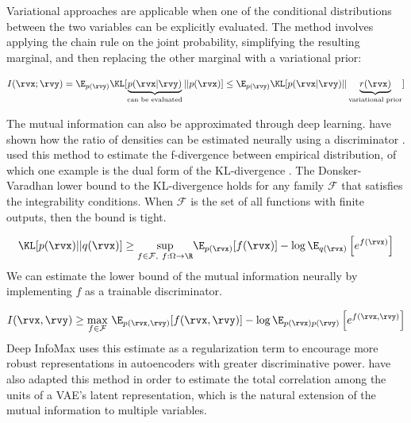 \documentclass[withindex,glossary,firstyr,times]{cam-thesis}
\begin{document}
Variational approaches \citet{houthooft2016vime, alemi2016deep} are applicable when one of the conditional distributions between the two variables can be explicitly evaluated. The method involves applying the chain rule on the joint probability, simplifying the resulting marginal, and then replacing the other marginal with a variational prior:

\begin{equation}
    I(\rvx; \rvy) = \E_{p(\rvy)} \KL[\underbrace{p(\rvx | \rvy)}_{\text{can be evaluated}} || p(\rvx)] \leq \E_{p(\rvy)} \KL[p(\rvx | \rvy) || \underbrace{r(\rvx)}_{\text{variational prior}}]
\end{equation}

The mutual information can also be approximated through deep learning. \citet{sugiyama2012density, mescheder2017adversarial} have shown how the ratio of densities can be estimated neurally using a discriminator \cite{goodfellow2014generative}. \citet{nowozin2016f} used this method to estimate the f-divergence between empirical distribution, of which one example is the dual form of the KL-divergence \cite{nguyen2010estimating}. The Donsker-Varadhan lower bound to the KL-divergence \cite{donsker1983asymptotic} holds for any family $\mathcal{F}$ that satisfies the integrability conditions. When $\mathcal{F}$ is the set of all functions with finite outputs, then the bound is tight.

\begin{equation}
    \KL [p(\rvx) || q(\rvx)] \geq \underset{f \in \mathcal{F}, ~ f: \Omega \to \R}{\sup} \E_{p(\rvx)} [f(\rvx)] - \log \E_{q(\rvx)} \left[ e^{f(\rvx)} \right]
\end{equation}
We can estimate the lower bound of the mutual information neurally \cite{belghazi2018mutual} by implementing $f$ as a trainable discriminator.

\begin{equation}
    I(\rvx, \rvy) \geq \underset{f \in \mathcal{F}}{\max} ~ \E_{p(\rvx, \rvy)} [f(\rvx, \rvy)] - \log \E_{p(\rvx)p(\rvy)} \left[ e^{f(\rvx, \rvy)} \right]
\end{equation}
Deep InfoMax \cite{hjelm2018learning} uses this estimate as a regularization term to encourage more robust representations in autoencoders with greater discriminative power. \citet{kim2018disentangling} have also adapted this method in order to estimate the total correlation \cite{watanabe1960information} among the units of a VAE's latent representation, which is the natural extension of the mutual information to multiple variables.
\end{document}

